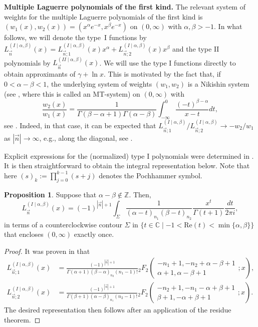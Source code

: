 \documentclass[a4paper,12pt,oneside]{article}
\theoremstyle{definition}
\newtheorem{prop}[defi]{Proposition}
\newcommand{\Z}{\mathbb{Z}}
\newcommand{\C}{\mathbb{C}}
\newcommand{\sz}[1]{\left| \vec{#1} \right|}
\begin{document}
\textbf{Multiple Laguerre polynomials of the first kind.} The relevant system of weights for the multiple Laguerre polynomials of the first kind is $(w_1(x),w_2(x))=(x^\alpha e^{-x},x^\beta e^{-x})$ on $(0,\infty)$ with $\alpha,\beta>-1$. In what follows, we will denote the type~I functions by $L_{\vec{n}}^{(I\mid \alpha,\beta)}(x) = L_{\vec{n};1}^{(I\mid \alpha,\beta)}(x) x^\alpha + L_{\vec{n};2}^{(I\mid \alpha,\beta)}(x) x^\beta$ and the type II polynomials by $L_{\vec{n}}^{(II\mid \alpha,\beta)}(x)$. We will use the type I functions directly to obtain approximants of $\gamma + \ln x$. This is motivated by the fact that, if $0<\alpha-\beta<1$, the underlying system of weights $(w_1,w_2)$ is a Nikishin system (see \cite{NikiSor}, where this is called an MT-system) on $(0,\infty)$ with
    $$ \frac{w_2(x)}{w_1(x)} = \frac{1}{\Gamma(\beta-\alpha+1)\Gamma(\alpha-\beta)} \int_{-\infty}^0 \frac{(-t)^{\beta-\alpha}}{x-t} dt,$$
see \cite[Eq. 5.12.3]{DLMF}. Indeed, in that case, it can be expected that $L_{\vec{n};1}^{(I\mid \alpha,\beta)}/L_{\vec{n};2}^{(I\mid \alpha,\beta)} \to -w_2/w_1$ as $\sz{n}\to\infty$, e.g., along the diagonal, see \cite[Theorem 1.4]{Lop-Per}.
\medbreak

Explicit expressions for the (normalized) type I polynomials were determined in \cite[Proposition 4.6]{VAWolfs}. It is then straightforward to obtain the integral representation below. Note that here $(s)_k:=\prod_{j=0}^{k-1} (s+j)$ denotes the Pochhammer symbol. 

\begin{prop} \label{L_I_int}
Suppose that $\alpha-\beta\not\in\Z$. Then,
   $$ L_{\vec{n}}^{(I\mid \alpha,\beta)}(x) = (-1)^{\sz{n}+1} \int_\Sigma \frac{1}{(\alpha-t)_{n_1}(\beta-t)_{n_2}} \frac{x^t}{\Gamma(t+1)} \frac{dt}{2\pi i}, $$
   in terms of a counterclockwise contour $\Sigma$ in $\{t\in\C\mid -1< \text{Re}(t) < \min\{\alpha,\beta\}\}$ that encloses $(0,\infty)$ exactly once.
\end{prop}
\begin{proof}
It was proven in \cite[Section 4.2.1]{VAWolfs} that
$$\begin{aligned}
       L_{\vec{n};1}^{(I\mid \alpha,\beta)}(x) &= \frac{(-1)^{\sz{n}+1}}{\Gamma(\alpha+1) (\beta-\alpha)_{n_2} (n_1-1)!} {}_2F_2 \left( \begin{array}{c} -n_1+1,-n_2+\alpha-\beta+1 \\ \alpha+1,\alpha-\beta+1 \end{array}; x \right), \\
    L_{\vec{n};2}^{(I\mid \alpha,\beta)}(x) &= \frac{(-1)^{\sz{n}+1}}{\Gamma(\beta+1) (\alpha-\beta)_{n_1} (n_2-1)!} {}_2F_2 \left( \begin{array}{c} -n_2+1,-n_1-\alpha+\beta+1 \\ \beta+1,-\alpha+\beta+1 \end{array}; x \right).
\end{aligned}$$
The desired representation then follows after an application of the residue theorem.
\end{proof}
\end{document}
